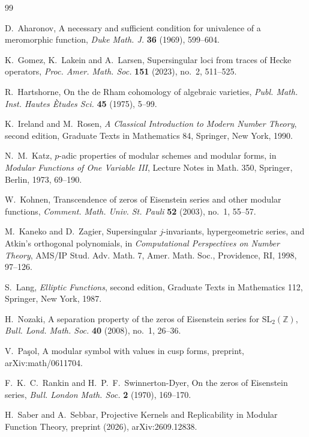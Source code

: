 \documentclass[11pt]{amsart}
\theoremstyle{definition}
\theoremstyle{remark}
\numberwithin{equation}{section}
\begin{document}
\begin{thebibliography}{99}

D.~Aharonov,
A necessary and sufficient condition for univalence of a meromorphic function,
\emph{Duke Math. J.} \textbf{36} (1969), 599--604.

K.~Gomez, K.~Lakein and A.~Larsen,
Supersingular loci from traces of Hecke operators,
\emph{Proc. Amer. Math. Soc.} \textbf{151} (2023), no.~2, 511--525.

R.~Hartshorne,
On the de Rham cohomology of algebraic varieties,
\emph{Publ. Math. Inst. Hautes \`Etudes Sci.} \textbf{45} (1975), 5--99.

K.~Ireland and M.~Rosen,
\emph{A Classical Introduction to Modern Number Theory},
second edition, Graduate Texts in Mathematics 84,
Springer, New York, 1990.

N.~M.~Katz,
$p$-adic properties of modular schemes and modular forms,
in \emph{Modular Functions of One Variable III},
Lecture Notes in Math. 350, Springer, Berlin, 1973, 69--190.

W.~Kohnen,
Transcendence of zeros of Eisenstein series and other modular functions,
\emph{Comment. Math. Univ. St. Pauli} \textbf{52} (2003), no.~1, 55--57.

M.~Kaneko and D.~Zagier,
Supersingular $j$-invariants, hypergeometric series, and Atkin's orthogonal polynomials,
in \emph{Computational Perspectives on Number Theory},
AMS/IP Stud. Adv. Math. 7, Amer. Math. Soc., Providence, RI, 1998, 97--126.

S.~Lang,
\emph{Elliptic Functions},
second edition, Graduate Texts in Mathematics 112, Springer, New York, 1987.

H.~Nozaki,
A separation property of the zeros of Eisenstein series for $\mathrm{SL}_2(\mathbb Z)$,
\emph{Bull. Lond. Math. Soc.} \textbf{40} (2008), no.~1, 26--36.

V.~Pa\c{s}ol,
A modular symbol with values in cusp forms,
preprint, arXiv:math/0611704.

F.~K.~C.~Rankin and H.~P.~F.~Swinnerton-Dyer,
On the zeros of Eisenstein series,
\emph{Bull. London Math. Soc.} \textbf{2} (1970), 169--170.

H.~Saber and A.~Sebbar,
Projective Kernels and Replicability in Modular Function Theory,
preprint (2026), arXiv:2609.12838.


\end{thebibliography}
\end{document}
